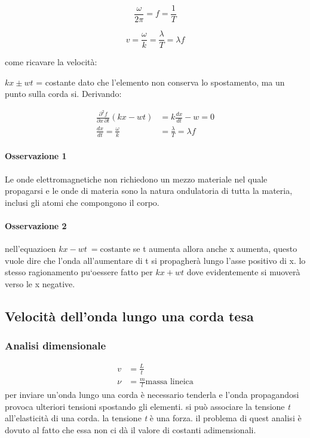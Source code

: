 \documentclass[a4paper,11pt]{article}
\begin{document}
    \begin{center}
        \[
        \frac{\omega}{2 \pi} = f = \frac{1}{T}   
        \]
    \end{center}

    \begin{center}
        \[
        v = \frac{\omega}{k} = \frac{\lambda}{T} = \lambda f   
        \]
    \end{center}

    come ricavare la velocità:

    \( kx \pm wt\) = costante dato che l'elemento non conserva lo spostamento, ma un punto sulla corda si. Derivando:

\begin{align*}
   \frac{\partial^2 f}{\partial x \, \partial t} (kx - wt) &= k \frac{dx}{dt} - w = 0
    \\
    \frac{dx}{dt} = \frac{\omega}{k} &= \frac{\lambda}{T} = \lambda f
\end{align*}
 
\paragraph{Osservazione 1}
Le onde elettromagnetiche non richiedono un mezzo materiale nel quale propagarsi e le onde di materia sono la natura ondulatoria di tutta la materia, inclusi gli atomi che compongono il corpo.

\paragraph{Osservazione 2}
nell'equazioen \(kx - wt\ = \text{costante} \) se t aumenta allora anche x aumenta, questo vuole dire che l'onda all'aumentare di t si propagherà lungo l'asse positivo di x. lo stesso ragionamento pu`oessere fatto per \(kx + wt\) dove evidentemente si muoverà verso le x negative. 

\subsection{Velocità dell'onda lungo una corda tesa}

\subsubsection{Analisi dimensionale}
\begin{align*}
    v &= \frac{L}{t} 
    \\
    \nu &= \frac{m}{l} \text{massa lineica}
\end{align*}
per inviare un'onda lungo una corda è necessario tenderla e l'onda propagandosi provoca ulteriori tensioni spostando gli elementi. si può associare la tensione \textit{t} all'elasticità di una corda. 
la tensione \textit{t} è una forza. il problema di quest analisi è dovuto al fatto che essa non ci dà il valore di costanti adimensionali.
\end{document}
